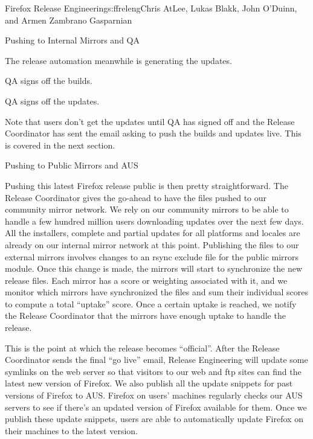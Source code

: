 \begin{aosachapter}{Firefox Release Engineering}{s:ffreleng}{Chris AtLee, Lukas Blakk, John O'Duinn, and Armen Zambrano Gasparnian}
\begin{aosasect1}{Pushing to Internal Mirrors and QA}
\begin{aosaitemize}
\item The release automation meanwhile is generating the updates.

\item QA signs off the builds.

\item QA signs off the updates.

\end{aosaitemize}
  
Note that users don't get the updates until QA has signed off and the
Release Coordinator has sent the email asking to push the builds and
updates live. This is covered in the next section.
  
\end{aosasect1}

\begin{aosasect1}{Pushing to Public Mirrors and AUS}

Pushing this latest Firefox release public is then pretty
straightforward. The Release Coordinator gives the go-ahead to have
the files pushed to our community mirror network. We rely on our
community mirrors to be able to handle a few hundred million users
downloading updates over the next few days. All the installers,
complete and partial updates for all platforms and locales are already
on our internal mirror network at this point. Publishing the files to
our external mirrors involves changes to an rsync exclude file for the
public mirrors module.  Once this change is made, the mirrors will
start to synchronize the new release files. Each mirror has a score or
weighting associated with it, and we monitor which mirrors have
synchronized the files and sum their individual scores to compute a
total ``uptake'' score. Once a certain uptake is reached, we notify
the Release Coordinator that the mirrors have enough uptake to handle
the release.

This is the point at which the release becomes ``official''. After the
Release Coordinator sends the final ``go live'' email, Release
Engineering will update some symlinks on the web server so that
visitors to our web and ftp sites can find the latest new version of
Firefox. We also publish all the update snippets for past versions of
Firefox to AUS. Firefox on users' machines regularly checks our AUS
servers to see if there's an updated version of Firefox available for
them. Once we publish these update snippets, users are able to
automatically update Firefox on their machines to the latest version.
  
\end{aosasect1}


\end{aosachapter}
